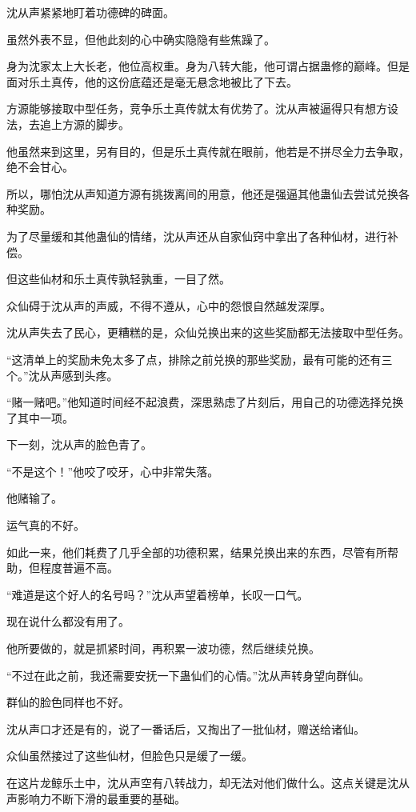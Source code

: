 
\begin{this_body}

沈从声紧紧地盯着功德碑的碑面。

虽然外表不显，但他此刻的心中确实隐隐有些焦躁了。

身为沈家太上大长老，他位高权重。身为八转大能，他可谓占据蛊修的巅峰。但是面对乐土真传，他的这份底蕴还是毫无悬念地被比了下去。

方源能够接取中型任务，竞争乐土真传就太有优势了。沈从声被逼得只有想方设法，去追上方源的脚步。

他虽然来到这里，另有目的，但是乐土真传就在眼前，他若是不拼尽全力去争取，绝不会甘心。

所以，哪怕沈从声知道方源有挑拨离间的用意，他还是强逼其他蛊仙去尝试兑换各种奖励。

为了尽量缓和其他蛊仙的情绪，沈从声还从自家仙窍中拿出了各种仙材，进行补偿。

但这些仙材和乐土真传孰轻孰重，一目了然。

众仙碍于沈从声的声威，不得不遵从，心中的怨恨自然越发深厚。

沈从声失去了民心，更糟糕的是，众仙兑换出来的这些奖励都无法接取中型任务。

“这清单上的奖励未免太多了点，排除之前兑换的那些奖励，最有可能的还有三个。”沈从声感到头疼。

“赌一赌吧。”他知道时间经不起浪费，深思熟虑了片刻后，用自己的功德选择兑换了其中一项。

下一刻，沈从声的脸色青了。

“不是这个！”他咬了咬牙，心中非常失落。

他赌输了。

运气真的不好。

如此一来，他们耗费了几乎全部的功德积累，结果兑换出来的东西，尽管有所帮助，但程度普遍不高。

“难道是这个好人的名号吗？”沈从声望着榜单，长叹一口气。

现在说什么都没有用了。

他所要做的，就是抓紧时间，再积累一波功德，然后继续兑换。

“不过在此之前，我还需要安抚一下蛊仙们的心情。”沈从声转身望向群仙。

群仙的脸色同样也不好。

沈从声口才还是有的，说了一番话后，又掏出了一批仙材，赠送给诸仙。

众仙虽然接过了这些仙材，但脸色只是缓了一缓。

在这片龙鲸乐土中，沈从声空有八转战力，却无法对他们做什么。这点关键是沈从声影响力不断下滑的最重要的基础。


\end{this_body}
